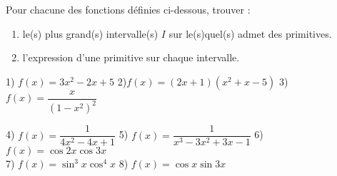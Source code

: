 



 \summary{}
 
\begin{exercice}
Pour chacune des fonctions définies ci-dessous, trouver :
\begin{enumerate}
    \item le(s) plus grand(s) intervalle(s) $I$ sur le(s)quel(s) admet des primitives.
    \item l'expression d'une primitive sur chaque intervalle.
\end{enumerate}

1) $f(x)=3x^2 - 2x + 5$ \hspace*{1cm} 2)$ f(x)= (2x+1)(x^2+x - 5)$ \hspace*{1cm} 3) $f(x) = \dfrac{x}{(1-x^2)^2}$

4) $f(x) = \dfrac{1}{4x^2 -4x + 1}$ \hspace*{1cm}  5) $f(x) = \dfrac{1}{x^3 - 3x^2+3x - 1}$ \hspace*{1cm}  6) $f(x) = \cos 2x\cos 3x$\\

7) $f(x) = \sin^3 x \cos^4 x $\hspace*{1cm}  8) $f(x) = \cos x\sin 3x$

\end{exercice}

